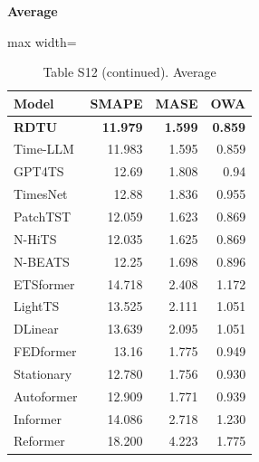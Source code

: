 \begin{table}[H]\centering\small
\caption*{Table S12 (continued). Average}
\textbf{Average}\par\smallskip
\begin{adjustbox}{max width=\linewidth}\begin{tabular}{lrrr}\toprule
\textbf{Model} & \textbf{SMAPE} & \textbf{MASE} & \textbf{OWA}\\\midrule
\rowcolor{blue!5}
\textbf{RDTU} & \textbf{11.979} & \textbf{1.599} & \textbf{0.859}\\
Time-LLM & 11.983 & 1.595 & 0.859\\
GPT4TS & 12.69 & 1.808 & 0.94\\
TimesNet & 12.88 & 1.836 & 0.955\\
PatchTST & 12.059 & 1.623 & 0.869\\
N-HiTS & 12.035 & 1.625 & 0.869\\
N-BEATS & 12.25 & 1.698 & 0.896\\
ETSformer & 14.718 & 2.408 & 1.172\\
LightTS & 13.525 & 2.111 & 1.051\\
DLinear & 13.639 & 2.095 & 1.051\\
FEDformer & 13.16 & 1.775 & 0.949\\
Stationary & 12.780 & 1.756 & 0.930\\
Autoformer & 12.909 & 1.771 & 0.939\\
Informer & 14.086 & 2.718 & 1.230\\
Reformer & 18.200 & 4.223 & 1.775\\
\bottomrule\end{tabular}\end{adjustbox}\end{table}
